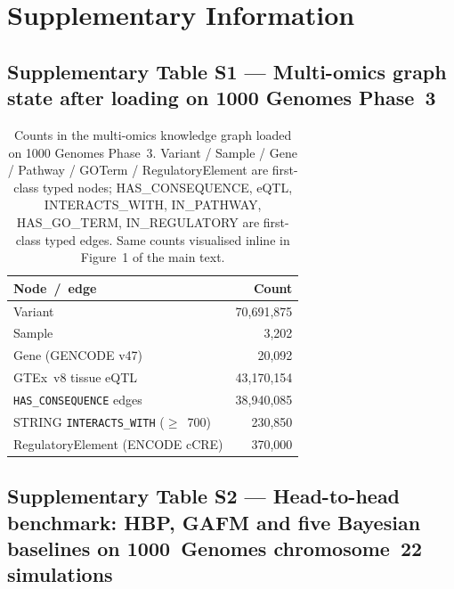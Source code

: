 \section*{Supplementary Information}

\setcounter{figure}{0}
\renewcommand{\thefigure}{S\arabic{figure}}
\setcounter{table}{0}
\renewcommand{\thetable}{S\arabic{table}}


\subsection*{Supplementary Table S1 --- Multi-omics graph state after loading on 1000 Genomes Phase~3}

\begin{table}[htbp]
\centering
\small
\begin{tabular}{lr}
\toprule
Node~/~edge & Count \\
\midrule
Variant & 70{,}691{,}875 \\
Sample & 3{,}202 \\
Gene (GENCODE v47) & 20{,}092 \\
GTEx~v8 tissue eQTL & 43{,}170{,}154 \\
\texttt{HAS\_CONSEQUENCE} edges & 38{,}940{,}085 \\
STRING \texttt{INTERACTS\_WITH} ($\geq$~700) & 230{,}850 \\
RegulatoryElement (ENCODE cCRE) & 370{,}000 \\
\bottomrule
\end{tabular}
\caption{Counts in the multi-omics knowledge graph loaded on 1000
Genomes Phase~3. Variant / Sample / Gene / Pathway / GOTerm /
RegulatoryElement are first-class typed nodes; HAS\_CONSEQUENCE,
eQTL, INTERACTS\_WITH, IN\_PATHWAY, HAS\_GO\_TERM,
IN\_REGULATORY are first-class typed edges. Same counts visualised
inline in Figure~1 of the main text.}
\label{tab:sup_graph}
\end{table}

\clearpage

\subsection*{Supplementary Table S2 --- Head-to-head benchmark: HBP, GAFM and five Bayesian baselines on 1000~Genomes chromosome~22 simulations}

